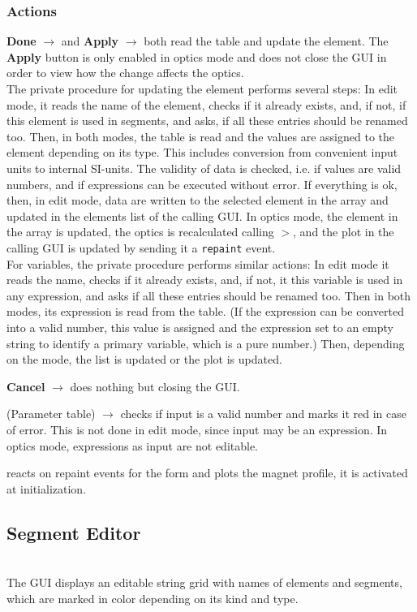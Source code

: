 \documentclass[12pt]{article}
\newcommand\code[1]{{\tt #1}}
\newcommand{\ofld}[1]{\colorbox{black!15}{{\bf #1}}}
\newcommand{\ofldx}[1]{\colorbox{black!15}{(#1)}}
\newcommand\guico[1]{{\color{blue}\code{#1}}}
\newcommand{\unico}[1]{{\color{burntorange}\code{#1}}}
\newcommand{\evcod}[2]{\ofld{#1} $\rightarrow$ \guico{#2}}
\newcommand{\evcodx}[2]{\ofldx{#1} $\rightarrow$ \guico{#2}}
\newcommand{\prcod}[2]{\opauni{#1}$>$\unico{#2}}
\newcommand{\opagui}[1]{\colorbox{blue!20}{{\color{black}\code{#1}}}}
\newcommand{\oguih}[2]{\subsection{\label{#2}#1}{\Huge\opagui{#2}}\\}
\newcommand{\ogui}[1]{\hyperref[#1]{\opagui{#1}}}
\newcommand{\opauni}[1]{\colorbox{orange!30}{{\color{black}\code{#1}}}}
\newcommand{\desc}[1]{#1}
\newcommand{\act}[1]{\subsubsection*{Actions} #1}
\begin{document}
\act{

\evcod{Done}{butOKClick} and \evcod{Apply}{butApplyClick} both read the table and update the element. The \ofld{Apply} button is only enabled in optics mode and does not close the GUI in order to view how the change affects the optics.\\ 
The private procedure \guico{SetElem} for updating the element performs several steps:
In edit mode, it reads the name of the element, checks if it already exists, and, if not, if this element is used in segments, and asks, if all these entries should be renamed too. Then, in both modes, the table is read and the values are assigned to the element depending on its type. This includes conversion from convenient input units to internal SI-units. The validity of data is checked, i.e. if values are valid numbers, and if expressions can be executed without error. If everything is ok, then, in edit mode, data are written to the selected element in the \unico{Elem} array and updated in the elements list of the calling \ogui{opamenu} GUI. In optics mode, the element in the \unico{Ella} array is updated, the optics is recalculated calling \prcod{linoplib}{OpticReCalc}, and the plot in the calling \ogui{opalinop} GUI is updated by sending it a \code{repaint} event.\\
For variables, the private procedure \guico{SetVar} performs similar actions: In edit mode it reads the name, checks if it already exists, and, if not, it this variable is used in any expression, and asks if all these entries should be renamed too. Then in both modes, its expression is read from the table. (If the expression can be converted into a valid number, this value is assigned and the expression set to an empty string to identify a primary variable, which is a pure number.) Then, depending on the mode, the \ogui{opamenu} list is updated or the \ogui{opalinop} plot is updated.

\evcod{Cancel}{butCancelClick} does nothing but closing the GUI.

\evcodx{Parameter table}{TabDrawCell} checks if input is a valid number and marks it red in case of error. This is not done in edit mode, since input may be an expression. In optics mode, expressions as input are not editable.

\guico{ppaint} reacts on repaint events for the form and plots the magnet profile, it is activated at initialization.
}


\oguih{Segment Editor}{osegedit}

\desc{
The GUI displays an editable string grid with names of elements and segments, which are marked in color depending on its kind and type. 
}
\end{document}
